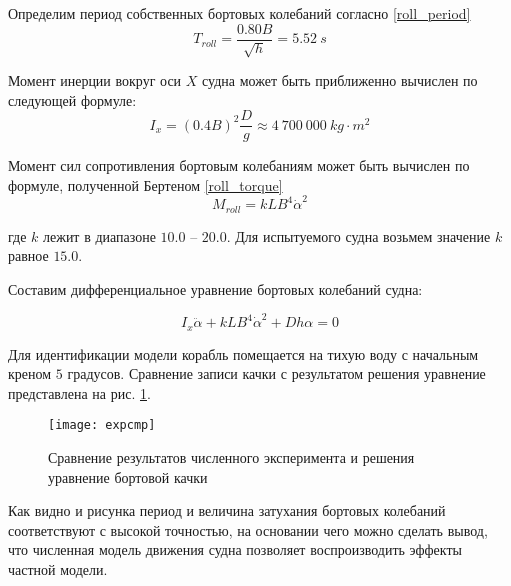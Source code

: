 Определим период собственных бортовых колебаний согласно \citep{hanovich47} \eqref{roll_period}
\begin{equation}
	T_{roll} = \frac{0.80B}{\sqrt{h}} = 5.52\ s
	\label{roll_period}
\end{equation}

Момент инерции вокруг оси $X$ судна может быть приближенно вычислен по следующей формуле:
\begin{equation}
	I_{x} = (0.4B)^2 \frac{D}{g} \approx 4\ 700\ 000\ kg\cdot m^2
	\label{roll_torque}
\end{equation}



Момент сил сопротивления бортовым колебаниям может быть вычислен по формуле, полученной Бертеном \eqref{roll_torque}
\begin{equation}
	M_{roll} = kLB^4\dot{\alpha}^2
	\label{roll_torque}
\end{equation}

где $k$ лежит в диапазоне $10.0$ -- $20.0$. Для испытуемого судна возьмем значение $k$ равное $15.0$.

Составим дифференциальное уравнение бортовых колебаний судна:

\begin{equation}
	I_x \ddot{\alpha} + kLB^4\dot{\alpha}^2 + Dh \alpha = 0
	\label{roll_eq}
\end{equation}

Для идентификации модели корабль помещается на тихую воду с начальным креном $5$ градусов. Сравнение записи качки с результатом решения уравнение представлена на рис. \ref{expcmp}.

\begin{figure}[ht]
\begin{center}
\texttt{[image: expcmp]}
\end{center}
\caption{Сравнение результатов численного эксперимента и решения уравнение бортовой качки}
\label{expcmp}
\end{figure}

Как видно и рисунка период и величина затухания бортовых колебаний соответствуют с высокой точностью, на основании чего можно сделать вывод, что численная модель движения судна позволяет воспроизводить эффекты частной модели.

